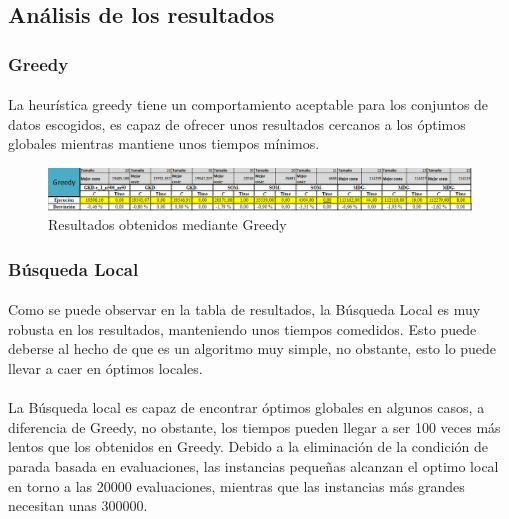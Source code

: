 \documentclass{article}
\begin{document}
	
	\subsection{Análisis de los resultados}
	
		\subsubsection{Greedy}
		
				\paragraph{}La heurística greedy tiene un comportamiento aceptable para los conjuntos de datos escogidos, es capaz de ofrecer unos resultados cercanos a los óptimos globales mientras mantiene unos tiempos mínimos.
			
			\begin{figure}[H]
				
				\centering
				\includegraphics[scale=0.4]{img/greegyResult}
				\caption{Resultados obtenidos mediante Greedy}
				
			\end{figure}
		
		\subsubsection{Búsqueda Local}
		
				\paragraph{}Como se puede observar en la tabla de resultados, la Búsqueda Local es muy robusta en los resultados, manteniendo unos tiempos comedidos. Esto puede deberse al hecho de que es un algoritmo muy simple, no obstante, esto lo puede llevar a caer en óptimos locales.
				
			 \paragraph{}La Búsqueda local es capaz de encontrar óptimos globales en algunos casos, a diferencia de Greedy, no obstante, los tiempos pueden llegar a ser 100 veces más lentos que los obtenidos en Greedy. Debido a la eliminación de la condición de parada basada en evaluaciones, las instancias pequeñas alcanzan el optimo local en torno a las 20000 evaluaciones, mientras que las instancias más grandes necesitan unas 300000.
				
\end{document}
